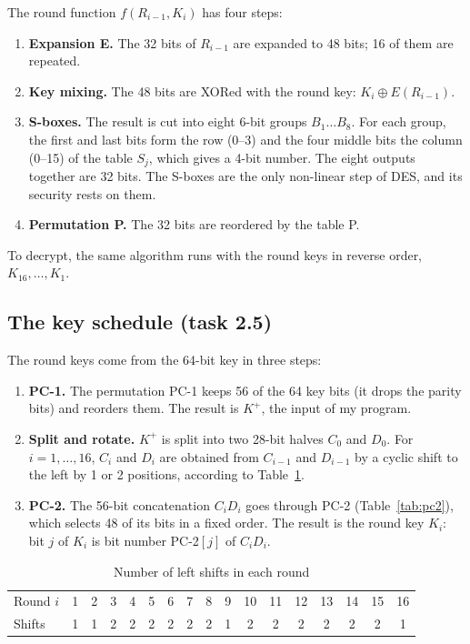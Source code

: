 \documentclass[11pt,a4paper]{article}
\begin{document}
The round function $f(R_{i-1}, K_i)$ has four steps:
\begin{enumerate}
  \item \textbf{Expansion E.} The 32 bits of $R_{i-1}$ are expanded to 48 bits; 16 of them are
  repeated.
  \item \textbf{Key mixing.} The 48 bits are XORed with the round key: $K_i \oplus E(R_{i-1})$.
  \item \textbf{S-boxes.} The result is cut into eight 6-bit groups $B_1 \dots B_8$. For each group,
  the first and last bits form the row (0--3) and the four middle bits the column (0--15) of the
  table $S_j$, which gives a 4-bit number. The eight outputs together are 32 bits. The S-boxes are
  the only non-linear step of DES, and its security rests on them.
  \item \textbf{Permutation P.} The 32 bits are reordered by the table P.
\end{enumerate}

To decrypt, the same algorithm runs with the round keys in reverse order, $K_{16}, \dots, K_1$.

\subsection{The key schedule (task 2.5)}

The round keys come from the 64-bit key in three steps:
\begin{enumerate}
  \item \textbf{PC-1.} The permutation PC-1 keeps 56 of the 64 key bits (it drops the parity bits)
  and reorders them. The result is $K^+$, the input of my program.
  \item \textbf{Split and rotate.} $K^+$ is split into two 28-bit halves $C_0$ and $D_0$. For
  $i = 1, \dots, 16$, $C_i$ and $D_i$ are obtained from $C_{i-1}$ and $D_{i-1}$ by a cyclic shift to
  the left by 1 or 2 positions, according to Table~\ref{tab:shifts}.
  \item \textbf{PC-2.} The 56-bit concatenation $C_iD_i$ goes through PC-2
  (Table~\ref{tab:pc2}), which selects 48 of its bits in a fixed order. The result is the round key
  $K_i$: bit $j$ of $K_i$ is bit number PC-2$[j]$ of $C_iD_i$.
\end{enumerate}

\begin{table}[H]
\centering
\caption{Number of left shifts in each round}\label{tab:shifts}
\setlength{\tabcolsep}{4pt}
\small
\begin{tabular}{l*{16}{c}}
\toprule
Round $i$ & 1 & 2 & 3 & 4 & 5 & 6 & 7 & 8 & 9 & 10 & 11 & 12 & 13 & 14 & 15 & 16 \\
Shifts & 1 & 1 & 2 & 2 & 2 & 2 & 2 & 2 & 1 & 2 & 2 & 2 & 2 & 2 & 2 & 1 \\
\bottomrule
\end{tabular}
\end{table}
\end{document}

